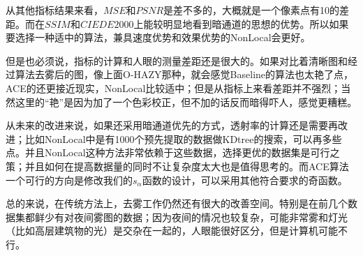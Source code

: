 \documentclass[12pt]{article}
\begin{document}
从其他指标结果来看，$MSE$和$PSNR$是差不多的，大概就是一个像素点有10的差距。而在$SSIM$和$CIEDE2000$上能较明显地看到暗通道的思想的优势。所以如果要选择一种适中的算法，兼具速度优势和效果优势的NonLocal会更好。\par
但是也必须说，指标的计算和人眼的测量差距还是很大的。如果对比着清晰图和经过算法去雾后的图，像上面O-HAZY那种，就会感觉Baseline的算法也太艳了点，ACE的还更接近现实，NonLocal比较适中；但是从指标上来看差距并不强烈；当然这里的“艳”是因为加了一个色彩校正，但不加的话反而暗得吓人，感觉更糟糕。\par
从未来的改进来说，如果还采用暗通道优先的方式，透射率的计算还是需要再改进；比如NonLocal中是有1000个预先提取的数据做KDtree的搜索，可以再多些点。并且NonLocal这种方法非常依赖于这些数据，选择更优的数据集是可行之策；并且如何在提高数据量的同时不让复杂度太大也是值得思考的。而ACE算法一个可行的方向是修改我们的$s_{\alpha}$函数的设计，可以采用其他符合要求的奇函数。\par
总的来说，在传统方法上，去雾工作仍然还有很大的改善空间。特别是在前几个数据集都鲜少有对夜间雾图的数据；因为夜间的情况也较复杂，可能非常雾和灯光（比如高层建筑物的光）是交杂在一起的，人眼能很好区分，但是计算机可能不行。
\\

\end{document}
